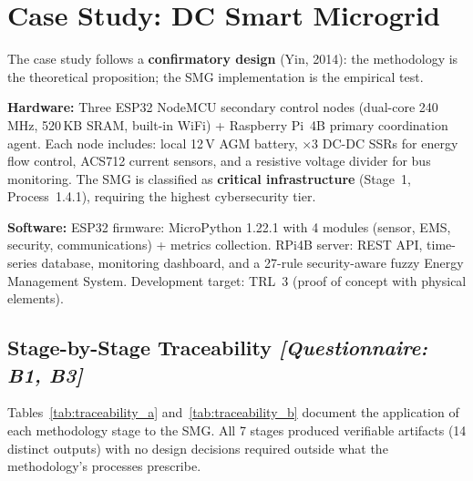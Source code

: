 \documentclass[12pt,a4paper]{article}
\newcommand{\qtag}[1]{\hfill\textcolor{gray!70}{\small\textit{[Questionnaire: #1]}}}
\begin{document}
\section{Case Study: DC Smart Microgrid}
\label{sec:casestudy}

The case study follows a \textbf{confirmatory design} (Yin, 2014): the methodology is the theoretical proposition; the SMG implementation is the empirical test.

\textbf{Hardware:} Three ESP32 NodeMCU secondary control nodes (dual-core 240\,MHz, 520\,KB SRAM, built-in WiFi) + Raspberry Pi~4B primary coordination agent. Each node includes: local 12\,V AGM battery, $\times$3 DC-DC SSRs for energy flow control, ACS712 current sensors, and a resistive voltage divider for bus monitoring. The SMG is classified as \textbf{critical infrastructure} (Stage~1, Process~1.4.1), requiring the highest cybersecurity tier.

\textbf{Software:} ESP32 firmware: MicroPython 1.22.1 with 4 modules (sensor, EMS, security, communications) + metrics collection. RPi4B server: REST API, time-series database, monitoring dashboard, and a 27-rule security-aware fuzzy Energy Management System. Development target: TRL~3 (proof of concept with physical elements).

\subsection{Stage-by-Stage Traceability \qtag{B1, B3}}
\label{sec:traceability}

Tables~\ref{tab:traceability_a} and~\ref{tab:traceability_b} document the application of each methodology stage to the SMG. All 7 stages produced verifiable artifacts (14 distinct outputs) with no design decisions required outside what the methodology's processes prescribe.
\end{document}
